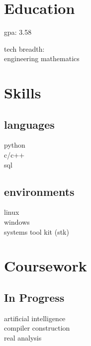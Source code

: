 
\begin{minipage}[t]{0.33\textwidth} %


\section{Education} 
\vspace{\topsep} %
\vspace{1pt}
\begin{tightitemize}
\item gpa: 3.58
\item tech breadth:\\engineering mathematics
\end{tightitemize}
\vspace{6pt}

\section{Skills}
\subsection{languages}
\normalsize
python \\
c/c++ \\
sql \\
\sectionspace

\subsection{environments}
linux \\
windows \\
systems tool kit (stk) \\

\sectionspace %

\section{Coursework}
\subsection{In Progress}
artificial intelligence\\
compiler construction\\
real analysis\\
\sectionspace



\end{minipage}
